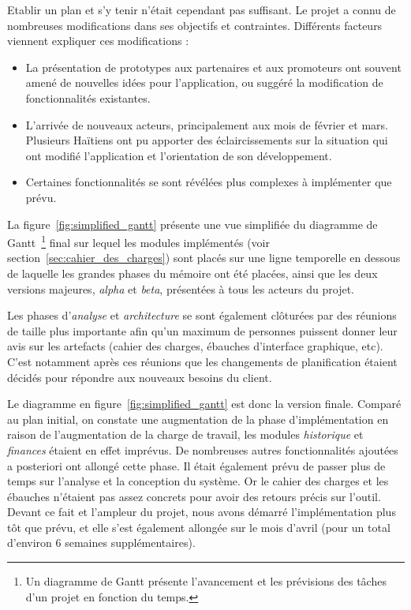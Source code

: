 \documentclass{EPL-master-thesis-covers-FR}
\begin{document}
				Etablir un plan et s'y tenir n'était cependant pas suffisant. Le projet a connu de nombreuses modifications dans ses objectifs et contraintes. Différents facteurs viennent expliquer ces modifications :

				\begin{itemize}
					\item La présentation de prototypes aux partenaires et aux promoteurs ont souvent amené de nouvelles idées pour l'application, ou suggéré la modification de fonctionnalités existantes.
					\item L'arrivée de nouveaux acteurs, principalement aux mois de février et mars. Plusieurs Haïtiens ont pu apporter des éclaircissements sur la situation qui ont modifié l'application et l'orientation de son développement.
					\item Certaines fonctionnalités se sont révélées plus complexes à implémenter que prévu.
				\end{itemize}

				La figure~\ref{fig:simplified_gantt} présente une vue simplifiée du diagramme de Gantt~\footnote{Un diagramme de Gantt présente l'avancement et les prévisions des tâches d'un projet en fonction du temps.} final sur lequel les modules implémentés (voir section~\ref{sec:cahier_des_charges}) sont placés sur une ligne temporelle en dessous de laquelle les grandes phases du mémoire ont été placées, ainsi que les deux versions majeures, \emph{alpha} et \emph{beta}, présentées à tous les acteurs du projet.

				Les phases d'\emph{analyse} et \emph{architecture} se sont également clôturées par des réunions de taille plus importante afin qu'un maximum de personnes puissent donner leur avis sur les artefacts (cahier des charges, ébauches d'interface graphique, etc). C'est notamment après ces réunions que les changements de planification étaient décidés pour répondre aux nouveaux besoins du client.

				Le diagramme en figure~\ref{fig:simplified_gantt} est donc la version finale. Comparé au plan initial, on constate une augmentation de la phase d'implémentation en raison de l'augmentation de la charge de travail, les modules \emph{historique} et \emph{finances} étaient en effet imprévus. De nombreuses autres fonctionnalités ajoutées a posteriori ont allongé cette phase.
				Il était également prévu de passer plus de temps sur l'analyse et la conception du système. Or le cahier des charges et les ébauches n'étaient pas assez concrets pour avoir des retours précis sur l'outil. Devant ce fait et l'ampleur du projet, nous avons démarré l'implémentation plus tôt que prévu, et elle s'est également allongée sur le mois d'avril (pour un total d'environ 6 semaines supplémentaires).
\end{document}
